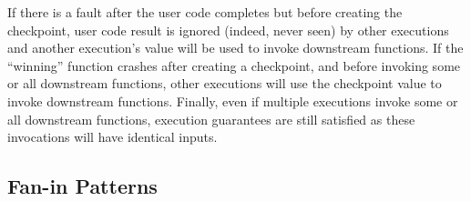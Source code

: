 If there is a fault after the user code completes but before creating the
checkpoint, user code result is ignored (indeed, never seen) by other
executions and another execution's value will be used to invoke downstream
functions.  If the ``winning'' function crashes after creating a checkpoint,
and before invoking some or all downstream functions, other executions will
use the checkpoint value to invoke downstream functions. Finally, even if
multiple executions invoke some or all downstream functions, execution
guarantees are still satisfied as these invocations will have identical
inputs.



\subsection{Fan-in Patterns}\label{sec:design:fanin}

